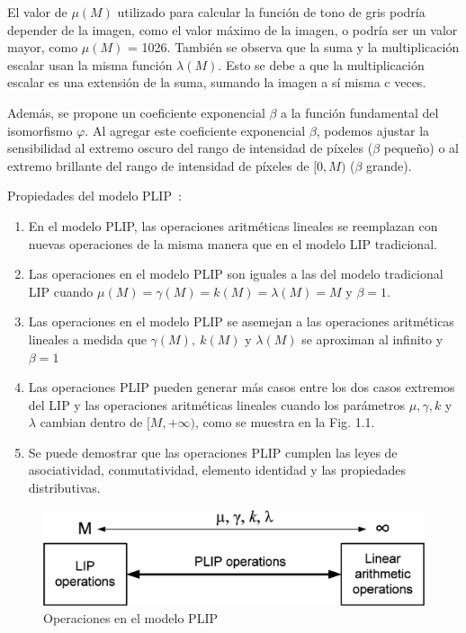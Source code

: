 El valor de $\mu(M)$ utilizado para calcular la función de tono de gris podría depender de la imagen, como el valor máximo de la imagen, o podría ser un valor mayor, como $\mu(M)$ = 1026. También se observa que la suma y la multiplicación escalar usan la misma función $\lambda(M)$. Esto se debe a que la multiplicación escalar es una extensión de la suma, sumando la imagen a sí misma c veces.

Además, se propone un coeficiente exponencial $\beta$ a la función fundamental del isomorfismo $\varphi$. Al agregar este coeficiente exponencial $\beta$, podemos ajustar la sensibilidad al extremo oscuro del rango de intensidad de píxeles ($\beta$ pequeño) o al extremo brillante del rango de intensidad de píxeles de $[0, M)$ ($\beta$ grande).

Propiedades del modelo PLIP~\cite{panetta2010parameterized}:

\begin{enumerate}
	\item En el modelo PLIP, las operaciones aritméticas lineales se reemplazan con nuevas operaciones de la misma manera que en el modelo LIP tradicional.
	\item Las operaciones en el modelo PLIP son iguales a las del modelo tradicional LIP cuando $\mu(M) = \gamma(M) = k(M) = \lambda(M) = M$ y
	$\beta = 1$.
	\item Las operaciones en el modelo PLIP se asemejan a las operaciones aritméticas lineales a medida que $\gamma(M),~k(M)$ y $\lambda(M)$ se aproximan al infinito y $\beta = 1$
	\item Las operaciones PLIP pueden generar más casos entre los dos casos extremos del LIP y las operaciones aritméticas lineales cuando los parámetros $\mu, \gamma, k$ y $\lambda$ cambian dentro de $[M, +\infty)$, como se muestra en la Fig. 1.1.
	\item Se puede demostrar que las operaciones PLIP cumplen las leyes de asociatividad, conmutatividad, elemento identidad y las propiedades distributivas.
\end{enumerate}

\begin{figure}
	\begin{center}
		\caption{Operaciones en el modelo PLIP}
		\includegraphics[width=8.0 cm]{images/plip_scheme.png}
	\end{center}
\end{figure}

